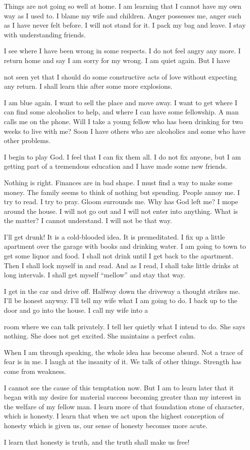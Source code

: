 \begin{biblechapter}
Things are not going so well at home. I am learning that I cannot have my own way as I used to. I blame my wife and children. Anger possesses me, anger such as I have never felt before. I will not stand for it. I pack my bag and leave. I stay with understanding friends.

I see where I have been wrong in some respects. I do not feel angry any more. I return home and say I am sorry for my wrong. I am quiet again. But I have

not seen yet that I should do some constructive acts of love without expecting any return. I shall learn this after some more explosions.

I am blue again. I want to sell the place and move away. I want to get where I can find some alcoholics to help, and where I can have some fellowship. A man calls me on the phone. Will I take a young fellow who has been drinking for two weeks to live with me? Soon I have others who are alcoholics and some who have other problems.

I begin to play God. I feel that I can fix them all. I do not fix anyone, but I am getting part of a tremendous education and I have made some new friends.

Nothing is right. Finances are in bad shape. I must find a way to make some money. The family seems to think of nothing but spending. People annoy me. I try to read. I try to pray. Gloom surrounds me. Why has God left me? I mope around the house. I will not go out and I will not enter into anything. What is the matter? I cannot understand. I will not be that way.

I’ll get drunk! It is a cold-blooded idea. It is premeditated. I fix up a little apartment over the garage with books and drinking water. I am going to town to get some liquor and food. I shall not drink until I get back to the apartment. Then I shall lock myself in and read. And as I read, I shall take little drinks at long intervals. I shall get myself “mellow” and stay that way.

I get in the car and drive off. Halfway down the driveway a thought strikes me. I’ll be honest anyway. I’ll tell my wife what I am going to do. I back up to the door and go into the house. I call my wife into a

room where we can talk privately. I tell her quietly what I intend to do. She says nothing. She does not get excited. She maintains a perfect calm.

When I am through speaking, the whole idea has become absurd. Not a trace of fear is in me. I laugh at the insanity of it. We talk of other things. Strength has come from weakness.

I cannot see the cause of this temptation now. But I am to learn later that it began with my desire for material success becoming greater than my interest in the welfare of my fellow man. I learn more of that foundation stone of character, which is honesty. I learn that when we act upon the highest conception of honesty which is given us, our sense of honesty becomes more acute.

I learn that honesty is truth, and the truth shall make us free!
\end{biblechapter}
